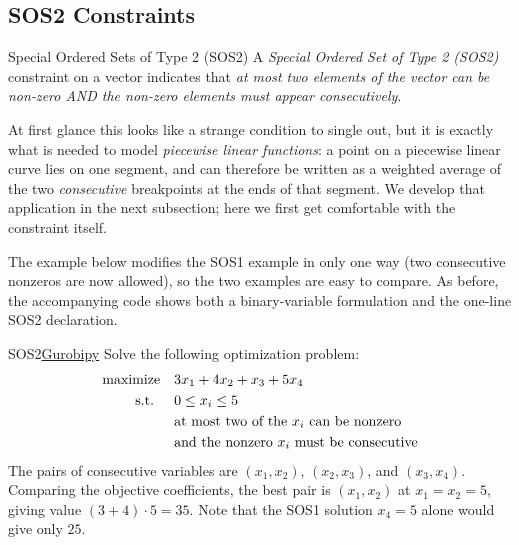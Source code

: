 \subsection{SOS2 Constraints}
\begin{definition}{Special Ordered Sets of Type 2 (SOS2)}{}
A \emph{Special Ordered Set of Type 2 (SOS2)} constraint on a vector indicates that \emph{at most two elements of the vector can be non-zero AND the non-zero elements must appear consecutively}.
\end{definition}
At first glance this looks like a strange condition to single out, but it is exactly what is needed to model \emph{piecewise linear functions}: a point on a piecewise linear curve lies on one segment, and can therefore be written as a weighted average of the two \emph{consecutive} breakpoints at the ends of that segment.  We develop that application in the next subsection; here we first get comfortable with the constraint itself.

The example below modifies the SOS1 example in only one way (two consecutive nonzeros are now allowed), so the two examples are easy to compare.  As before, the accompanying code shows both a binary-variable formulation and the one-line SOS2 declaration.

\begin{examplewithcode}{SOS2}{\href{https://github.com/open-optimization/open-optimization-or-examples/blob/master/nonlinear-programming/Gurobi-SOS-Examples.ipynb}{Gurobipy}}
\label{example:SOS2}
Solve the following optimization problem: \[\begin{aligned}
\mbox{maximize}\quad & 3x_1 + 4x_2 + x_3 + 5x_4 \\
\mbox{ s.t. } \quad & 0 \le x_i \le 5 \\
& \mbox{at most two of the $x_i$ can be nonzero} \\
& \mbox{and the nonzero $x_i$ must be consecutive}
\end{aligned}\]
The pairs of consecutive variables are $(x_1,x_2)$, $(x_2,x_3)$, and $(x_3,x_4)$.  Comparing the objective coefficients, the best pair is $(x_1, x_2)$ at $x_1 = x_2 = 5$, giving value $(3+4)\cdot 5 = 35$.  Note that the SOS1 solution $x_4=5$ alone would give only $25$.
\end{examplewithcode}

